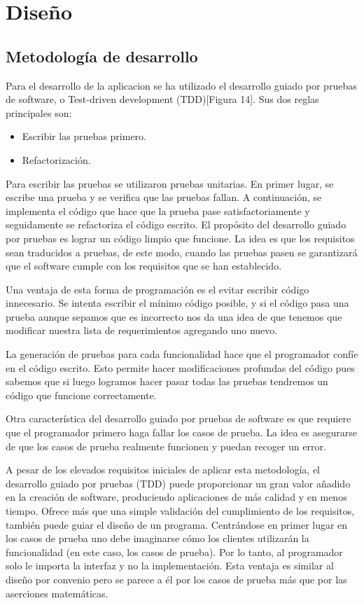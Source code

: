 \section{Diseño}
\label{section:diseno}

\subsection{Metodología de desarrollo}
\label{sec:metodologia_desarrollo}
Para el desarrollo de la aplicacion se ha utilizado el desarrollo guiado por pruebas de software, o Test-driven development (TDD)[Figura 14]. Sus dos reglas principales son:
\begin{itemize}
 \item Escribir las pruebas primero.
 \item Refactorización.
\end{itemize}

Para escribir las pruebas se utilizaron pruebas unitarias. En primer lugar, se escribe una prueba y se verifica que las pruebas fallan. A continuación, se implementa el código que hace que la prueba pase satisfactoriamente y seguidamente se refactoriza el código escrito. El propósito del desarrollo guiado por pruebas es lograr un código limpio que funcione. La idea es que los requisitos sean traducidos a pruebas, de este modo, cuando las pruebas pasen se garantizará que el software cumple con los requisitos que se han establecido.

Una ventaja de esta forma de programación es el evitar escribir código innecesario. Se intenta escribir el mínimo código posible, y si el código pasa una prueba aunque sepamos que es incorrecto nos da una idea de que tenemos que modificar nuestra lista de requerimientos agregando uno nuevo.

La generación de pruebas para cada funcionalidad hace que el programador confíe en el código escrito. Esto permite hacer modificaciones profundas del código pues sabemos que si luego logramos hacer pasar todas las pruebas tendremos un código que funcione correctamente.

Otra característica del desarrollo guiado por pruebas de software es que requiere que el programador primero haga fallar los casos de prueba. La idea es asegurarse de que los casos de prueba realmente funcionen y puedan recoger un error.

A pesar de los elevados requisitos iniciales de aplicar esta metodología, el desarrollo guiado por pruebas (TDD) puede proporcionar un gran valor añadido en la creación de software, produciendo aplicaciones de más calidad y en menos tiempo. Ofrece más que una simple validación del cumplimiento de los requisitos, también puede guiar el diseño de un programa. Centrándose en primer lugar en los casos de prueba uno debe imaginarse cómo los clientes utilizarán la funcionalidad (en este caso, los casos de prueba). Por lo tanto, al programador solo le importa la interfaz y no la implementación. Esta ventaja es similar al diseño por convenio pero se parece a él por los casos de prueba más que por las aserciones matemáticas.

